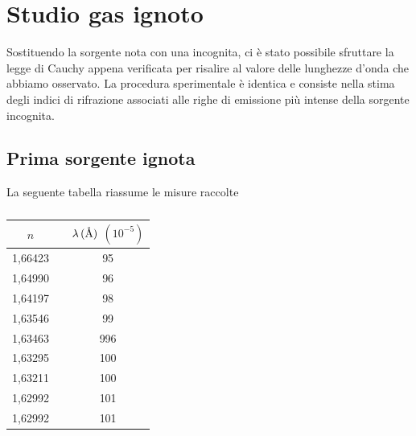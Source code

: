 \section{Studio gas ignoto}
Sostituendo la sorgente nota con una incognita, ci è stato possibile sfruttare la legge di Cauchy appena verificata per risalire al valore delle lunghezze d’onda che abbiamo osservato.
La procedura sperimentale è identica e consiste nella stima degli indici di rifrazione associati alle righe di emissione più intense della sorgente incognita.
\subsection{Prima sorgente ignota}
La seguente tabella riassume le misure raccolte
\begin{table}[h!]
    \centering
    \begin{tabular}{ccc}
    \toprule
    $n$ && $\lambda\,(\mbox{\normalfont\AA})$ $(10^{-5})$ \\
    \midrule
    1,66423  &&  95\\
    1,64990  &&  96\\
    1,64197  &&  98\\
    1,63546  &&  99\\
    1,63463  &&  996\\
    1,63295  &&  100\\
    1,63211  &&  100\\
    1,62992  &&  101\\
    1,62992  &&  101\\
    \bottomrule
    \end{tabular}
    \caption{}
    \label{tab:my_label}
\end{table}

